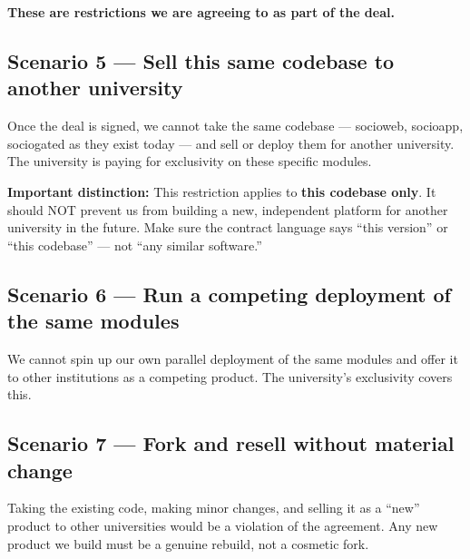 \documentclass[12pt,a4paper]{article}
\begin{document}
\begin{cannotbox}
\textbf{\color{red} These are restrictions we are agreeing to as part of the deal.}
\end{cannotbox}

\vspace{0.4cm}

\subsection{Scenario 5 — Sell this same codebase to another university}

Once the deal is signed, we cannot take the same codebase — socioweb, socioapp, sociogated as they exist today — and sell or deploy them for another university. The university is paying for exclusivity on these specific modules.

\begin{warnbox}
\textbf{Important distinction:} This restriction applies to \textbf{this codebase only}. It should NOT prevent us from building a new, independent platform for another university in the future. Make sure the contract language says ``this version'' or ``this codebase'' — not ``any similar software.''
\end{warnbox}

\vspace{0.3cm}

\subsection{Scenario 6 — Run a competing deployment of the same modules}

We cannot spin up our own parallel deployment of the same modules and offer it to other institutions as a competing product. The university's exclusivity covers this.

\vspace{0.3cm}

\subsection{Scenario 7 — Fork and resell without material change}

Taking the existing code, making minor changes, and selling it as a ``new'' product to other universities would be a violation of the agreement. Any new product we build must be a genuine rebuild, not a cosmetic fork.

\end{document}
